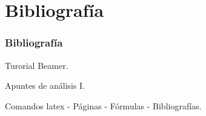 \documentclass{beamer}
\begin{document}
\section{Bibliografía}
\begin{frame}
  \frametitle{Bibliografía}

  \begin{thebibliography}{10}

    \beamertemplatebookbibitems
    Turorial Beamer. 

    \beamertemplatebookbibitems
    Apuntes de análisis I.
    
    \beamertemplatebookbibitems
    Comandos latex - Páginas - Fórmulas - Bibliografías. 

   

  \end{thebibliography}
\end{frame}

\end{document}
